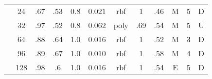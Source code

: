\begin{table}
\begin{tabular}{|c|c|ccccc||ccccc|}
  &  24 &   .67 &  .53 & 0.8 &    0.021 &    rbf &     1 &  .46 &      M & 5 &       D \\
  &  32 &   .97 &  .52 & 0.8 &    0.062 &   poly &   .69 &  .54 &      M & 5 &       U \\
  &  64 &   .88 &  .64 & 1.0 &    0.016 &    rbf &     1 &  .52 &      M & 3 &       D \\
  &  96 &   .89 &  .67 & 1.0 &    0.010 &    rbf &     1 &  .58 &      M & 4 &       D \\
  & 128 &   .98 &   .6 & 1.0 &    0.016 &    rbf &     1 &  .54 &      E & 5 &       D \\\hline
\end{tabular}
\end{table}
